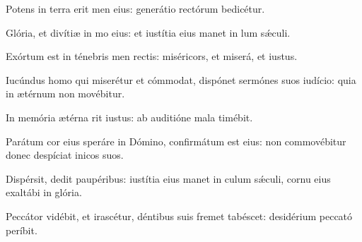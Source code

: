 \item {}

\item Potens in terra erit men eius:\psstar{} generátio rectórum bedicétur.

\item Glória, et divítiæ in mo eius:\psstar{} et iustítia eius manet in lum sǽculi.

\item Exórtum est in ténebris men rectis:\psstar{} miséricors, et miserá, et iustus.

\item Iucúndus homo qui miserétur et cómmodat,\pscross{} dispónet sermónes suos  iudício:\psstar{} quia in ætérnum non movébitur.

\item In memória ætérna rit iustus:\psstar{} ab auditióne mala  timébit.

\item Parátum cor eius speráre in Dómino,\pscross{} confirmátum est  eius:\psstar{} non commovébitur donec despíciat inicos suos.

\item Dispérsit, dedit paupéribus:\pscross{} iustítia eius manet in culum sǽculi,\psstar{} cornu eius exaltábi in glória.

\item Peccátor vidébit, et irascétur,\pscross{} déntibus suis fremet  tabéscet:\psstar{} desidérium peccató períbit.